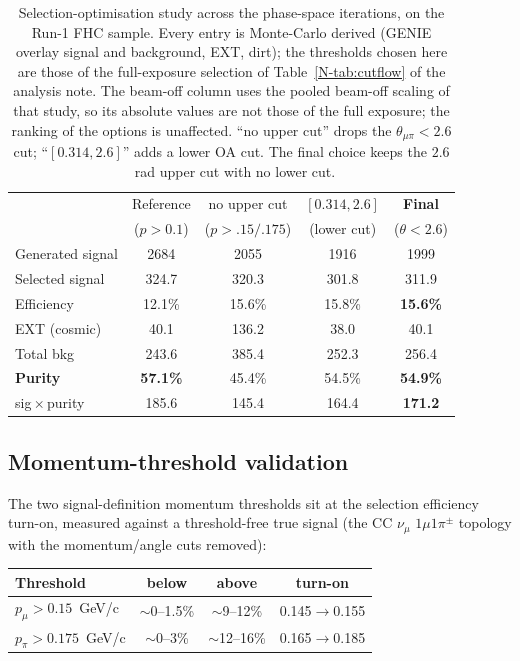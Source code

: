 \documentclass[11pt,a4paper]{article}
\newcommand{\noteref}[2]{#1~\ref{N-#2} of the analysis note}
\begin{document}
\begin{table}[H]
  \centering
  \caption{Selection-optimisation study across the phase-space iterations, on the Run-1
    FHC sample. Every entry is Monte-Carlo derived (GENIE overlay signal and background,
    EXT, dirt); the thresholds chosen here are those of the full-exposure selection of
    \noteref{Table}{tab:cutflow}. The beam-off column uses the pooled beam-off scaling of that
    study, so its absolute values are not those of the full exposure; the ranking of the
    options is unaffected.  ``no upper cut'' drops the
    $\theta_{\mu\pi}<2.6$ cut; ``$[0.314,2.6]$'' adds a lower OA cut.  The final choice
    keeps the $2.6$~rad upper cut with no lower cut.}
  \label{tab:phasespace}
  \begin{tabular}{lcccc}
    \toprule
    & Reference & no upper cut & $[0.314,2.6]$ & \textbf{Final} \\
    & ($p{>}0.1$) & ($p{>}.15/.175$) & (lower cut) & ($\theta{<}2.6$) \\
    \midrule
    Generated signal       & 2684  & 2055  & 1916  & 1999 \\
    Selected signal        & 324.7 & 320.3 & 301.8 & 311.9 \\
    Efficiency             & 12.1\% & 15.6\% & 15.8\% & \textbf{15.6\%} \\
    EXT (cosmic)           & 40.1  & 136.2 & 38.0  & 40.1 \\
    Total bkg              & 243.6 & 385.4 & 252.3 & 256.4 \\
    \textbf{Purity}        & \textbf{57.1\%} & 45.4\% & 54.5\% & \textbf{54.9\%} \\
    sig\,$\times$\,purity  & 185.6 & 145.4 & 164.4 & \textbf{171.2} \\
    \bottomrule
  \end{tabular}
\end{table}


\subsection{Momentum-threshold validation}
The two signal-definition momentum thresholds sit at the selection efficiency
turn-on, measured against a threshold-free true signal (the CC $\nu_\mu$
$1\mu1\pi^\pm$ topology with the momentum/angle cuts removed):

\begin{center}\small
\begin{tabular}{lccc}
\toprule
Threshold & below & above & turn-on \\
\midrule
$p_\mu > 0.15$~GeV/c  & $\sim$0--1.5\% & $\sim$9--12\%  & 0.145$\to$0.155 \\
$p_\pi > 0.175$~GeV/c & $\sim$0--3\%   & $\sim$12--16\% & 0.165$\to$0.185 \\
\bottomrule
\end{tabular}
\end{center}
\end{document}
